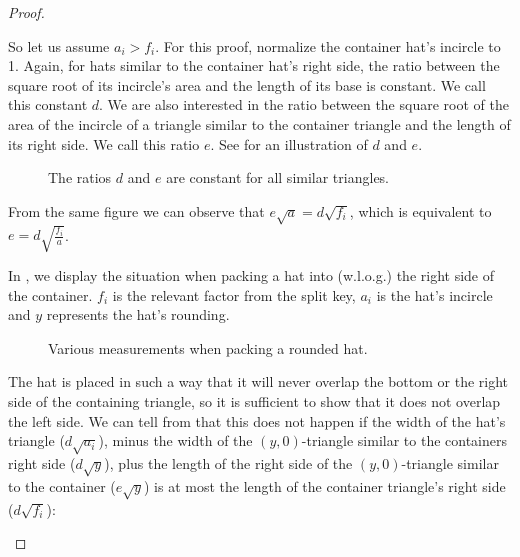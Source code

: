 \documentclass[a4paper,style=print,bibliography=totoc,nexus,lnum,extramargin]{tubsbook}
\begin{document}
\begin{proof}
\begin{itemize}
            So let us assume $a_i > f_i$. For this proof, normalize the container hat's incircle to 1. Again, for hats similar to the container hat's right side, the ratio between the square root of its incircle's area and the length of its base is constant. We call this constant $d$.
            We are also interested in the ratio between the square root of the area of the incircle of a triangle similar to the container triangle and the length of its right side. We call this ratio $e$. See  for an illustration of $d$ and $e$.

            \begin{figure}

                \caption{The ratios $d$ and $e$ are constant for all similar triangles.}
                \label{fig:hatpokef}
            \end{figure}

            From the same figure we can observe that
            $e\sqrt{a} = d\sqrt{f_i}$, which is equivalent to $e = d\sqrt{\frac{f_i}{a}}$.


            In , we display the situation when packing a hat into (w.l.o.g.) the right side of the container. $f_i$ is the relevant factor from the split key, $a_i$ is the hat's incircle and $y$ represents the hat's rounding.

            \begin{figure}

                \caption{Various measurements when packing a rounded hat.}
                \label{fig:hatpoke}
            \end{figure}

            The hat is placed in such a way that it will never overlap the bottom or the right side of the containing triangle, so it is sufficient to show that it does not overlap the left side.
            We can tell from  that this does not happen if the width of the hat's triangle ($d\sqrt{a_i}$), minus the width of the $(y,0)$-triangle similar to the containers right side ($d\sqrt{y}$), plus the length of the right side of the $(y,0)$-triangle similar to the container ($e\sqrt{y}$) is at most the length of the container triangle's right side ($d\sqrt{f_i}$):


\end{itemize}
\end{proof}
\end{document}
